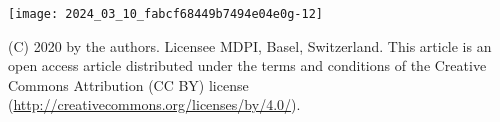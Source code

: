 \documentclass[10pt]{article}
\begin{document}
\begin{center}
\texttt{[image: 2024\_03\_10\_fabcf68449b7494e04e0g-12]}
\end{center}

(C) 2020 by the authors. Licensee MDPI, Basel, Switzerland. This article is an open access article distributed under the terms and conditions of the Creative Commons Attribution (CC BY) license (\href{http://creativecommons.org/licenses/by/4.0/}{http://creativecommons.org/licenses/by/4.0/}).
\end{document}

